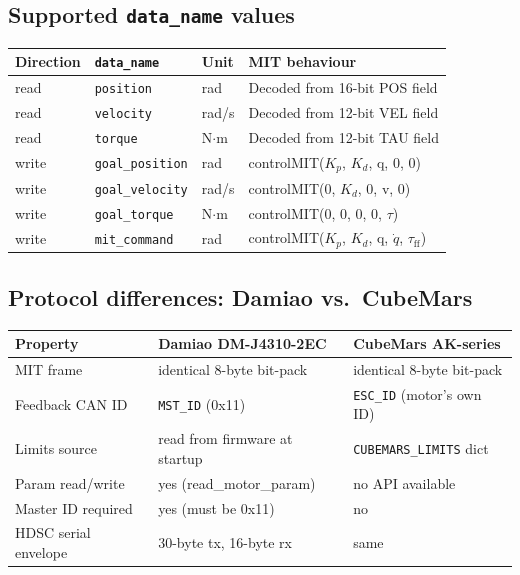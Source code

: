 \documentclass[11pt,a4paper]{article}
\begin{document}
\subsection{Supported \texttt{data\_name} values}

\begin{center}\small
\begin{tabular}{llll}
\toprule
Direction & \texttt{data\_name} & Unit & MIT behaviour\\
\midrule
read  & \texttt{position}       & rad     & Decoded from 16-bit POS field\\
read  & \texttt{velocity}       & rad/s   & Decoded from 12-bit VEL field\\
read  & \texttt{torque}         & N$\cdot$m & Decoded from 12-bit TAU field\\
\midrule
write & \texttt{goal\_position} & rad     & controlMIT($K_p$, $K_d$, q, 0, 0)\\
write & \texttt{goal\_velocity} & rad/s   & controlMIT(0, $K_d$, 0, v, 0)\\
write & \texttt{goal\_torque}   & N$\cdot$m & controlMIT(0, 0, 0, 0, $\tau$)\\
write & \texttt{mit\_command}   & rad     & controlMIT($K_p$, $K_d$, q, $\dot{q}$, $\tau_{\text{ff}}$)\\
\bottomrule
\end{tabular}
\end{center}

\subsection{Protocol differences: Damiao vs.\ CubeMars}

\begin{center}\small
\begin{tabular}{lll}
\toprule
Property & Damiao DM-J4310-2EC & CubeMars AK-series\\
\midrule
MIT frame & identical 8-byte bit-pack & identical 8-byte bit-pack\\
Feedback CAN ID & \texttt{MST\_ID} (0x11) & \texttt{ESC\_ID} (motor's own ID)\\
Limits source & read from firmware at startup & \texttt{CUBEMARS\_LIMITS} dict\\
Param read/write & yes (read\_motor\_param) & no API available\\
Master ID required & yes (must be 0x11) & no\\
HDSC serial envelope & 30-byte tx, 16-byte rx & same\\
\bottomrule
\end{tabular}
\end{center}
\end{document}
